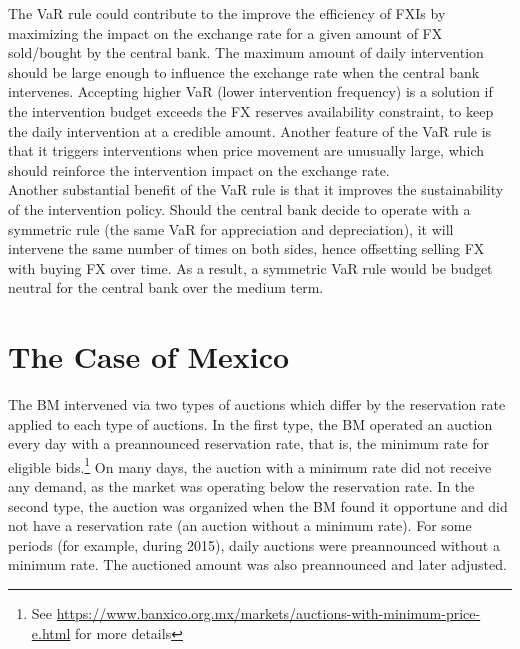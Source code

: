 \documentclass[11pt]{article}
\begin{document}
The  VaR rule  could  contribute to  the  improve the  efficiency  of FXIs  by
maximizing  the  impact  on  the  exchange  rate for  a  given  amount  of  FX
sold/bought  by the  central bank.  The maximum  amount of  daily intervention
should be  large enough to influence  the exchange rate when  the central bank
intervenes. Accepting higher VaR (lower  intervention frequency) is a solution
if the intervention budget exceeds the FX reserves availability constraint, to
keep the daily  intervention at a credible amount. Another  feature of the VaR
rule  is that  it triggers  interventions  when price  movement are  unusually
large, which should reinforce the intervention impact on the exchange rate.\\

Another  substantial  benefit  of  the  VaR  rule  is  that  it  improves  the
sustainability of the  intervention policy. Should the central  bank decide to
operate  with   a  symmetric   rule  (the  same   VaR  for   appreciation  and
depreciation), it will intervene the same number of times on both sides, hence
offsetting selling FX with  buying FX over time. As a  result, a symmetric VaR
rule would be budget neutral for the central bank over the medium term.\\



\section{The Case of Mexico}
\label{sec:mexico-case}

The BM  intervened via two types  of auctions which differ  by the reservation
rate applied to each  type of auctions. In the first type,  the BM operated an
auction every day  with a preannounced reservation rate, that  is, the minimum
rate               for               eligible               bids.\footnote{See
\url{https://www.banxico.org.mx/markets/auctions-with-minimum-price-e.html}
for  more details}  On many  days, the  auction with  a minimum  rate did  not
receive any demand, as the market was operating below the reservation rate. In
the second type, the auction was organized  when the BM found it opportune and
did not have a reservation rate (an auction without a minimum rate).  For some
periods (for example, during 2015), daily auctions were preannounced without a
minimum  rate.   The   auctioned  amount  was  also   preannounced  and  later
adjusted.\\
\end{document}
